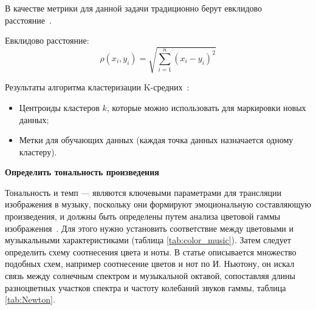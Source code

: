 В качестве метрики для данной задачи традиционно берут евклидово расстояние~\cite{defcluctering, pruf_clustering, feature_representations}.

Евклидово расстояние:
\begin{equation}
	\rho(x_i, y_i) = \sqrt{\sum_{i=1}^{n} (x_i - y_i)^2}
	\label{eq:evclid}
\end{equation}

Результаты алгоритма кластеризации K-средних~\cite{academic_performance}:

\begin{itemize}
	\item Центроиды кластеров \(k\), которые можно использовать для маркировки новых данных;
	\item Метки для обучающих данных (каждая точка данных назначается одному кластеру).
\end{itemize}


\textbf{Определить тональность произведения}



Тональность и темп --- являются ключевыми параметрами для трансляции изображения в музыку, поскольку они формируют эмоциональную составляющую произведения, и должны быть определены путем анализа цветовой гаммы изображения~\cite{actuality}. Для этого нужно установить соответствие между цветовыми и музыкальными характеристиками \cite{web} (таблица \ref{tab:color_music}). Затем следует определить схему соотнесения цвета и ноты\cite{web}. В статье \cite{colortonote} описывается множество подобных схем, например соотнесение цветов и нот по И. Ньютону, он искал связь между солнечным спектром и музыкальной октавой, сопоставляя длины разноцветных участков спектра и частоту колебаний звуков гаммы, таблица \ref{tab:Newton}.
	
